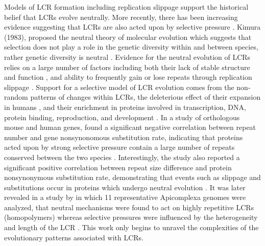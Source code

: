 \documentclass[10pt]{article}
\begin{document}
Models of LCR formation including replication slippage support the historical belief that LCRs evolve neutrally. More
recently, there has been increasing evidence suggesting that LCRs are also acted upon by selective pressure \citep{haerty2010low}. Kimura (1983), proposed the neutral theory of molecular evolution which suggests that selection does not play a role
in the genetic diversity within and between species, rather genetic diversity is neutral \citep{nevo2001genetic}. Evidence for the neutral evolution of LCRs relies on a large number of factors including both their lack of stable structure and function \citep{dunker2002intrinsic, haerty2010low}, and ability to frequently gain or lose repeats through replication slippage \citep{kruglyak1998equilibrium, marcotte1999census, huntley2000evolution}. Support for a selective model of LCR evolution comes from the non-random patterns of changes within LCRs, the deleterious effect of their expansion in humans \citep{karlin2002amino}, and their
enrichment in proteins involved in transcription, DNA, protein binding, reproduction, and development \citep{huntley2007evolutionary, haerty2010genome, battistuzzi2016profiles}. In a study of orthologous mouse and human genes, \citet{mularoni2007highly} found a significant negative correlation between repeat number and gene nonsynonomous substitution rate, indicating
that proteins acted upon by strong selective pressure contain a large number of repeats conserved between the two species
\citep{mularoni2007highly}. Interestingly, the study also reported a significant positive correlation between repeat size difference
and protein nonsynonymous substitution rate, demonstrating that events such as slippage and substitutions occur in proteins
which undergo neutral evolution \citep{mularoni2007highly}. It was later revealed in a study by \citet{battistuzzi2016profiles} in which 11 representative Apicomplexa genomes were analyzed, that neutral mechanisms were found to act on highly repetitive LCRs
(homopolymers) whereas selective pressures were influenced by the heterogeneity and length of the LCR \citep{battistuzzi2016profiles}. This work only begins to unravel the complexities of the evolutionary patterns associated with LCRs.
\end{document}
